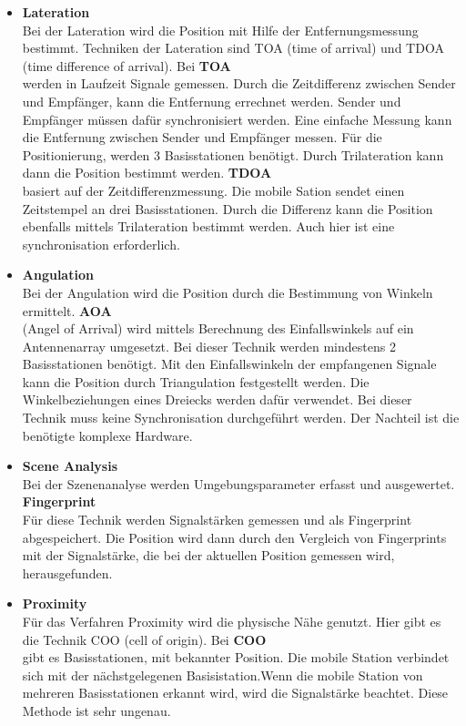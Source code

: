 \begin{itemize}
    \begin{itemize}
      \item \textbf{Lateration}\\
      Bei der Lateration wird die Position mit Hilfe der Entfernungsmessung bestimmt.
      Techniken der Lateration sind TOA (time of arrival) und TDOA (time difference of arrival).
      Bei \textbf{TOA}\\ werden in Laufzeit Signale gemessen. Durch die Zeitdifferenz zwischen Sender und Empfänger, kann die Entfernung errechnet werden. Sender und Empfänger müssen dafür synchronisiert werden. Eine einfache Messung kann die Entfernung zwischen Sender und Empfänger messen. Für die Positionierung, werden 3 Basisstationen benötigt. Durch Trilateration kann dann die Position bestimmt werden.
      \textbf{TDOA}\\ basiert auf der Zeitdifferenzmessung. 
      Die mobile Sation sendet einen Zeitstempel an drei Basisstationen. Durch die Differenz kann die Position ebenfalls mittels Trilateration bestimmt werden. Auch hier ist eine synchronisation erforderlich.
      \item \textbf{Angulation}\\
      Bei der Angulation wird die Position durch die Bestimmung von Winkeln ermittelt.
      \textbf{AOA}\\ (Angel of Arrival) wird mittels Berechnung des Einfallswinkels auf ein Antennenarray umgesetzt. Bei dieser Technik werden mindestens 2 Basisstationen benötigt. Mit den Einfallswinkeln der empfangenen Signale kann die Position durch Triangulation festgestellt werden. Die Winkelbeziehungen eines Dreiecks werden dafür verwendet.
      Bei dieser Technik muss keine Synchronisation durchgeführt werden. Der Nachteil ist die benötigte komplexe Hardware. 
      \item \textbf{Scene Analysis}\\
      Bei der Szenenanalyse werden Umgebungsparameter erfasst und ausgewertet.
      \textbf{Fingerprint}\\
      Für diese Technik werden Signalstärken gemessen und als Fingerprint abgespeichert. Die Position wird dann durch den Vergleich von Fingerprints mit der Signalstärke, die bei der aktuellen Position gemessen wird, herausgefunden.
      \item \textbf{Proximity}\\
      Für das Verfahren Proximity wird die physische Nähe genutzt.
      Hier gibt es die Technik COO (cell of origin).
      Bei \textbf{COO}\\ gibt es Basisstationen, mit bekannter Position. Die mobile Station verbindet sich mit der nächstgelegenen Basisistation.Wenn die mobile Station von mehreren Basisstationen erkannt wird, wird die Signalstärke beachtet.
      Diese Methode ist sehr ungenau.
    \end{itemize}


\end{itemize}
